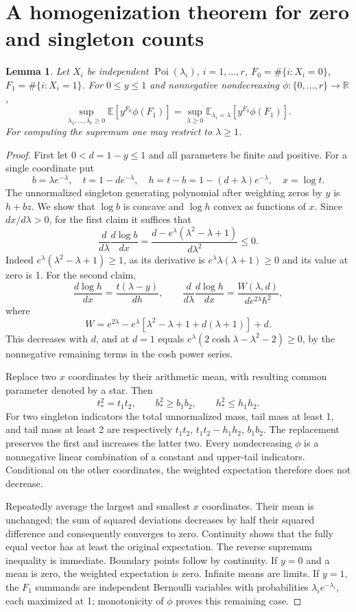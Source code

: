 \documentclass[11pt]{article}
\newtheorem{lemma}{Lemma}
\newcommand{\E}{\mathbb E}
\newcommand{\Poi}{\operatorname{Poi}}
\begin{document}
\section{A homogenization theorem for zero and singleton counts}
\begin{lemma}\label{lem:homog}
Let $X_i$ be independent $\Poi(\lambda_i)$, $i=1,\ldots,r$,
$F_0=\#\{i:X_i=0\}$, $F_1=\#\{i:X_i=1\}$.
For $0\le y\le1$ and nonnegative nondecreasing
$\phi:\{0,\ldots,r\}\to\mathbb R$,
\[
 \sup_{\lambda_1,\ldots,\lambda_r\ge0}\E[y^{F_0}\phi(F_1)]
 =\sup_{\lambda\ge0}\E_{\lambda_i=\lambda}[y^{F_0}\phi(F_1)].
\]
For computing the supremum one may restrict to $\lambda\ge1$.
\end{lemma}
\begin{proof}
First let $0<d=1-y\le1$ and all parameters be finite and positive.
For a single coordinate put
\[
 b=\lambda e^{-\lambda},\quad t=1-de^{-\lambda},\quad
 h=t-b=1-(d+\lambda)e^{-\lambda},\quad x=\log t.
\]
The unnormalized singleton generating polynomial after weighting zeros
by $y$ is $h+bz$. We show that $\log b$ is concave and $\log h$ convex
as functions of $x$. Since $dx/d\lambda>0$, for the first claim it
suffices that
\[
 \frac{d}{d\lambda}\frac{d\log b}{dx}
 =\frac{d-e^\lambda(\lambda^2-\lambda+1)}{d\lambda^2}\le0.
\]
Indeed $e^\lambda(\lambda^2-\lambda+1)\ge1$, as its derivative is
$e^\lambda\lambda(\lambda+1)\ge0$ and its value at zero is 1.
For the second claim,
\[
 \frac{d\log h}{dx}=\frac{t(\lambda-y)}{dh},\qquad
 \frac{d}{d\lambda}\frac{d\log h}{dx}
 =\frac{W(\lambda,d)}{de^{2\lambda}h^2},
\]
where
\[
 W=e^{2\lambda}-e^\lambda[\lambda^2-\lambda+1+d(\lambda+1)]+d.
\]
This decreases with $d$, and at $d=1$ equals
$e^\lambda(2\cosh\lambda-\lambda^2-2)\ge0$, by the nonnegative
remaining terms in the cosh power series.

Replace two $x$ coordinates by their arithmetic mean, with resulting
common parameter denoted by a star. Then
\[
 t_*^2=t_1t_2,\qquad b_*^2\ge b_1b_2,\qquad h_*^2\le h_1h_2.
\]
For two singleton indicators the total unnormalized mass, tail mass at
least 1, and tail mass at least 2 are respectively
$t_1t_2$, $t_1t_2-h_1h_2$, $b_1b_2$.
The replacement preserves the first and increases the latter two.
Every nondecreasing $\phi$ is a nonnegative linear combination of a
constant and upper-tail indicators. Conditional on the other coordinates,
the weighted expectation therefore does not decrease.

Repeatedly average the largest and smallest $x$ coordinates. Their mean
is unchanged; the sum of squared deviations decreases by half their
squared difference and consequently converges to zero. Continuity shows
that the fully equal vector has at least the original expectation.
The reverse supremum inequality is immediate.
Boundary points follow by continuity. If $y=0$ and a mean is zero,
the weighted expectation is zero. Infinite means are limits.
If $y=1$, the $F_1$ summands are independent Bernoulli variables with
probabilities $\lambda_i e^{-\lambda_i}$, each maximized at 1;
monotonicity of $\phi$ proves this remaining case.


\end{proof}
\end{document}
